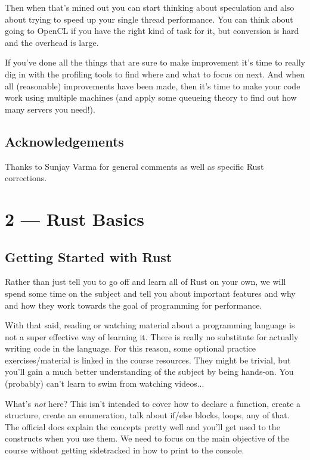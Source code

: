 \documentclass[a4paper]{report}
\begin{document}
Then when that's mined out you can start thinking about speculation and also about trying to speed up your single thread performance. You can think about going to OpenCL if you have the right kind of task for it, but conversion is hard and the overhead is large. 

If you've done all the things that are sure to make improvement it's time to really dig in with the profiling tools to find where and what to focus on next. And when all (reasonable) improvements have been made, then it's time to make your code work using multiple machines (and apply some queueing theory to find out how many servers you need!).

\section*{Acknowledgements} Thanks to Sunjay Varma for general comments as well as specific Rust corrections.









\chapter*{2 --- Rust Basics}


\section*{Getting Started with Rust}
Rather than just tell you to go off and learn all of Rust on your own, we will spend some time on the subject and tell you about important features and why and how they work towards the goal of programming for performance.

With that said, reading or watching material about a programming language is not a super effective way of learning it. There is really no substitute for actually writing code in the language. For this reason, some optional practice exercises/material is linked in the course resources. They might be trivial, but you'll gain a much better understanding of the subject by being hands-on. You (probably) can't learn to swim from watching videos...

What's \textit{not} here? This isn't intended to cover how to declare a function, create a structure, create an enumeration, talk about if/else blocks, loops, any of that. The official docs explain the concepts pretty well and you'll get used to the constructs when you use them. We need to focus on the main objective of the course without getting sidetracked in how to print to the console. 
\end{document}
